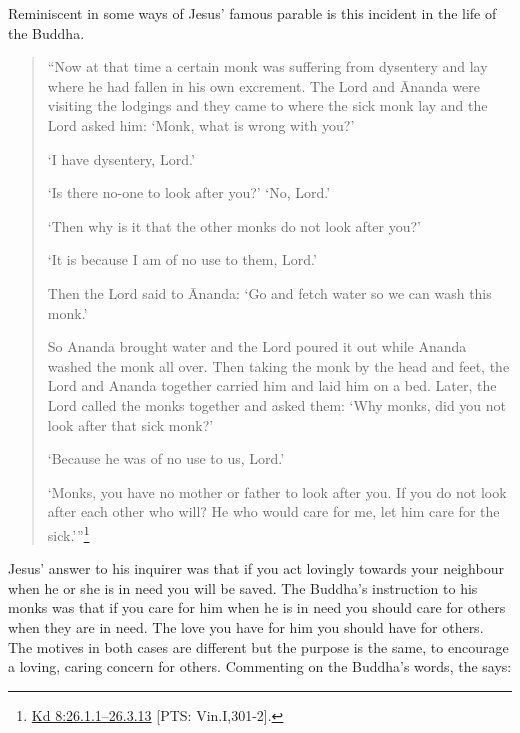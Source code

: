\documentclass[10pt, openright]{book}
\begin{document}
Reminiscent in some ways of Jesus’ famous parable is this incident in the life of the Buddha.


\begin{quote}


“Now at that time a certain monk was suffering from dysentery and lay where he had fallen in his own excrement. The Lord and Ānanda were visiting the lodgings and they came to where the sick monk lay and the Lord asked him: ‘Monk, what is wrong with you?’


‘I have dysentery, Lord.’


‘Is there no-one to look after you?’ ‘No, Lord.’


‘Then why is it that the other monks do not look after you?’


‘It is because I am of no use to them, Lord.’


Then the Lord said to Ānanda: ‘Go and fetch water so we can wash this monk.’


So Ananda brought water and the Lord poured it out while Ananda washed the monk all over. Then taking the monk by the head and feet, the Lord and Ananda together carried him and laid him on a bed. Later, the Lord called the monks together and asked them: ‘Why monks, did you not look after that sick monk?’


‘Because he was of no use to us, Lord.’


‘Monks, you have no mother or father to look after you. If you do not look after each other who will? He who would care for me, let him care for the sick.’”\footnote {\href{https://suttacentral.net/pli-tv-kd8/en/brahmali#26.1.1}{Kd 8:26.1.1–26.3.13} [PTS: Vin.I,301-2].}




\end{quote}
Jesus’ answer to his inquirer was that if you act lovingly towards your neighbour when he or she is in need you will be saved. The Buddha’s instruction to his monks was that if you care for him when he is in need you should care for others when they are in need. The love you have for him you should have for others. The motives in both cases are different but the purpose is the same, to encourage a loving, caring concern for others. Commenting on the Buddha’s words, the \cite{Saddhammopāyana} says:
\end{document}
